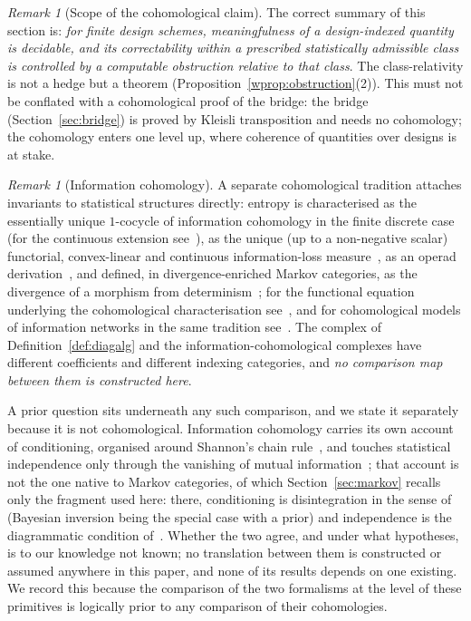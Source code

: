 \documentclass[11pt,a4paper]{article}
\theoremstyle{plain}
\theoremstyle{definition}
\theoremstyle{remark}
\newtheorem{remark}[theorem]{Remark}
\newtheorem{caveat}[theorem]{Remark}
\begin{document}
\begin{caveat}[Scope of the cohomological claim]
The correct summary of this section is: \emph{for finite design schemes,
meaningfulness of a design-indexed quantity is decidable, and its correctability
within a prescribed statistically admissible class is controlled by a computable
obstruction relative to that class}. The class-relativity is not a hedge but a
theorem (Proposition~\ref{wprop:obstruction}(2)). This must not be conflated
with a cohomological proof of the bridge: the bridge
(Section~\ref{sec:bridge}) is proved by Kleisli transposition and
needs no cohomology; the cohomology enters one level up, where coherence of
quantities over designs is at stake.
\end{caveat}

\begin{remark}[Information cohomology]\label{rem:infocohomology}
A separate cohomological tradition attaches invariants to statistical
structures directly: entropy is characterised as the essentially unique
$1$-cocycle of information cohomology in the finite discrete
case~\cite{baudot_homological_2015} (for the continuous extension
see~\cite{vigneaux_information_2021}), as the unique (up to a non-negative
scalar) functorial, convex-linear and continuous information-loss
measure~\cite{baez_characterization_2011}, as an operad
derivation~\cite{bradley_entropy_2021}, and defined, in divergence-enriched
Markov categories, as the divergence of a morphism from
determinism~\cite{perrone_markov_2024}; for the functional equation
underlying the cohomological characterisation see~\cite{bennequin_functional_2020}, and
for cohomological models of information networks in the same tradition
see~\cite{manin_homotopy_2024}. The complex of
Definition~\ref{def:diagalg} and the information-cohomological complexes have
different coefficients and different indexing categories, and \emph{no
comparison map between them is constructed here}.

A prior question sits underneath any such comparison, and we state it
separately because it is not cohomological. Information cohomology carries
its own account of conditioning, organised around Shannon's chain
rule~\cite{baudot_homological_2015,vigneaux_information_2021}, and touches
statistical independence only through the vanishing of mutual
information~\cite{baudot_homological_2015}; that account is not the one native
to Markov categories, of which Section~\ref{sec:markov} recalls only the
fragment used here: there, conditioning is disintegration in the sense
of~\cite{cho_disintegration_2019} (Bayesian inversion being the special case
with a prior) and independence is the diagrammatic
condition of~\cite{fritz_synthetic_2020}. Whether the two agree, and under
what hypotheses, is to our knowledge not known; no translation between them
is constructed or assumed anywhere in this paper, and none of its results
depends on one existing. We record this because the comparison of the two
formalisms at the level of these primitives is logically prior to any
comparison of their cohomologies.
\end{remark}
\end{document}
